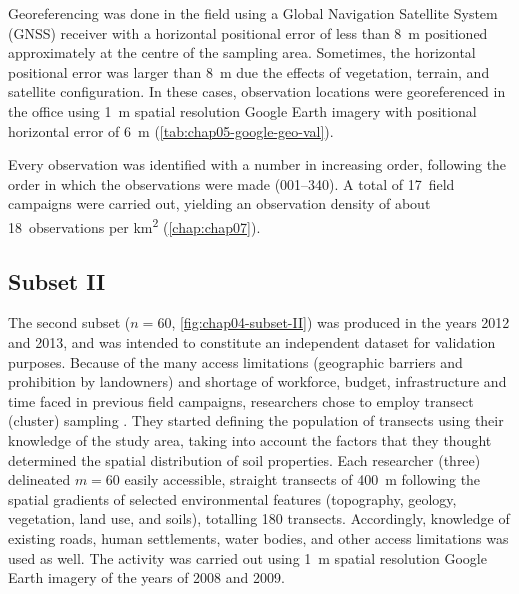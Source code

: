 Georeferencing was done in the field using a Global Navigation Satellite System (GNSS) receiver with a 
horizontal positional error of less than \SI{8}{\metre} positioned approximately at the centre of the
sampling area. Sometimes, the horizontal positional error was larger than \SI{8}{\metre} due the effects
of vegetation, terrain, and satellite configuration. In these cases, observation locations were georeferenced 
in the office using \SI{1}{\metre} spatial resolution Google Earth\rr{} imagery with positional horizontal 
error of \SI{6}{\metre} (\autoref{tab:chap05-google-geo-val}).

Every observation was identified with a number in increasing order, following the order in which the 
observations were made (\num{001}--\num{340}). A total of \num{17}~field campaigns were carried out, yielding 
an observation density of about \num{18}~observations per \si{\kilo\metre\squared} (\autoref{chap:chap07}).

\subsection{Subset II}
\label{sec:chap04-subset-ii}

The second subset ($n = 60$, \autoref{fig:chap04-subset-II}) was produced in the years \num{2012} and 
\num{2013}, and was intended to constitute an independent dataset for validation purposes. Because of the many 
access limitations (geographic barriers and prohibition by landowners) and shortage of workforce, budget, 
infrastructure and time faced in previous field campaigns, researchers chose to employ transect (cluster) 
sampling \cite{MiguelEtAl2012, Moura-BuenoEtAl2012, Samuel-RosaEtAl2013}. They started defining the population 
of transects using their knowledge of the study area, taking into account the factors that they thought 
determined the spatial distribution of soil properties. Each researcher (three) delineated $m = 60$ easily 
accessible, straight transects of \SI{400}{\metre} following the spatial gradients of selected environmental 
features (topography, geology, vegetation, land use, and soils), totalling 180 transects. Accordingly, 
knowledge of existing roads, human settlements, water bodies, and other access limitations was used as well. 
The activity was carried out using \SI{1}{\metre} spatial resolution Google Earth\rr{} imagery of the years of 
\num{2008} and \num{2009}.

